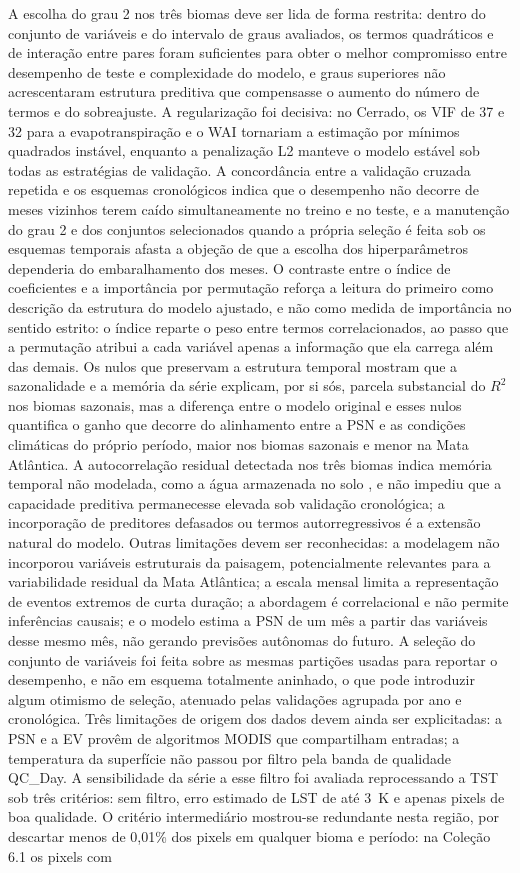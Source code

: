 \documentclass[a4paper,fleqn]{cas-dc}
\begin{document}
A escolha do grau 2 nos três biomas deve ser lida de forma restrita: dentro do conjunto de variáveis e do intervalo de graus avaliados, os termos quadráticos e de interação entre pares foram suficientes para obter o melhor compromisso entre desempenho de teste e complexidade do modelo, e graus superiores não acrescentaram estrutura preditiva que compensasse o aumento do número de termos e do sobreajuste. A regularização foi decisiva: no Cerrado, os VIF de 37 e 32 para a evapotranspiração e o WAI tornariam a estimação por mínimos quadrados instável, enquanto a penalização L2 manteve o modelo estável sob todas as estratégias de validação. A concordância entre a validação cruzada repetida e os esquemas cronológicos indica que o desempenho não decorre de meses vizinhos terem caído simultaneamente no treino e no teste, e a manutenção do grau 2 e dos conjuntos selecionados quando a própria seleção é feita sob os esquemas temporais afasta a objeção de que a escolha dos hiperparâmetros dependeria do embaralhamento dos meses. O contraste entre o índice de coeficientes e a importância por permutação reforça a leitura do primeiro como descrição da estrutura do modelo ajustado, e não como medida de importância no sentido estrito: o índice reparte o peso entre termos correlacionados, ao passo que a permutação atribui a cada variável apenas a informação que ela carrega além das demais. Os nulos que preservam a estrutura temporal mostram que a sazonalidade e a memória da série explicam, por si sós, parcela substancial do $R^2$ nos biomas sazonais, mas a diferença entre o modelo original e esses nulos quantifica o ganho que decorre do alinhamento entre a PSN e as condições climáticas do próprio período, maior nos biomas sazonais e menor na Mata Atlântica. A autocorrelação residual detectada nos três biomas indica memória temporal não modelada, como a água armazenada no solo \citep{oliveira2005}, e não impediu que a capacidade preditiva permanecesse elevada sob validação cronológica; a incorporação de preditores defasados ou termos autorregressivos é a extensão natural do modelo. Outras limitações devem ser reconhecidas: a modelagem não incorporou variáveis estruturais da paisagem, potencialmente relevantes para a variabilidade residual da Mata Atlântica; a escala mensal limita a representação de eventos extremos de curta duração; a abordagem é correlacional e não permite inferências causais; e o modelo estima a PSN de um mês a partir das variáveis desse mesmo mês, não gerando previsões autônomas do futuro. A seleção do conjunto de variáveis foi feita sobre as mesmas partições usadas para reportar o desempenho, e não em esquema totalmente aninhado, o que pode introduzir algum otimismo de seleção, atenuado pelas validações agrupada por ano e cronológica. Três limitações de origem dos dados devem ainda ser explicitadas: a PSN e a EV provêm de algoritmos MODIS que compartilham entradas; a temperatura da superfície não passou por filtro pela banda de qualidade QC\_Day. A sensibilidade da série a esse filtro foi avaliada reprocessando a TST sob três critérios: sem filtro, erro estimado de LST de até 3~K e apenas pixels de boa qualidade. O critério intermediário mostrou-se redundante nesta região, por descartar menos de 0,01\% dos pixels em qualquer bioma e período: na Coleção 6.1 os pixels com 
\end{document}
